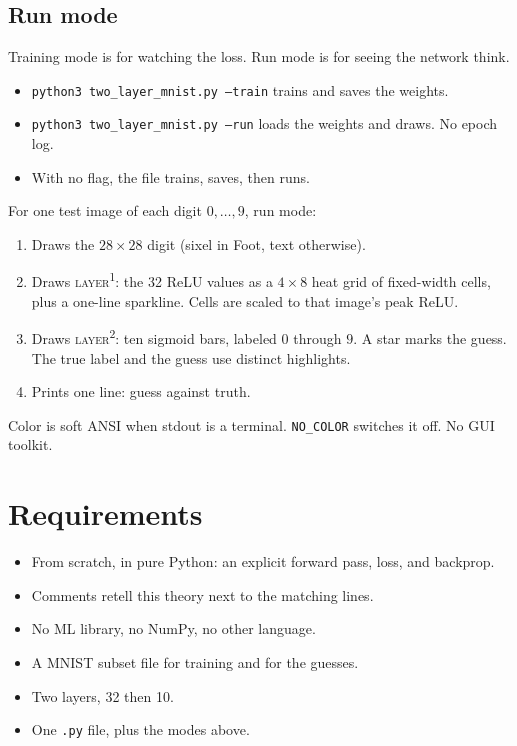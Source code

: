 \documentclass[11pt]{article}
\begin{document}
\subsection*{Run mode}

Training mode is for watching the loss. Run mode is for seeing the network think.

\begin{itemize}
  \item \texttt{python3 two\_layer\_mnist.py --train} trains and saves the weights.
  \item \texttt{python3 two\_layer\_mnist.py --run} loads the weights and draws. No epoch log.
  \item With no flag, the file trains, saves, then runs.
\end{itemize}

For one test image of each digit $0,\ldots,9$, run mode:

\begin{enumerate}
  \item Draws the $28\times 28$ digit (sixel in Foot, text otherwise).
  \item Draws \textsc{layer}\textsuperscript{1}: the 32 ReLU values as a $4\times 8$ heat grid of fixed-width cells, plus a one-line sparkline. Cells are scaled to that image's peak ReLU.
  \item Draws \textsc{layer}\textsuperscript{2}: ten sigmoid bars, labeled $0$ through $9$. A star marks the guess. The true label and the guess use distinct highlights.
  \item Prints one line: guess against truth.
\end{enumerate}

Color is soft ANSI when stdout is a terminal. \texttt{NO\_COLOR} switches it off. No GUI toolkit.

\section*{Requirements}

\begin{itemize}
  \item From scratch, in pure Python: an explicit forward pass, loss, and backprop.
  \item Comments retell this theory next to the matching lines.
  \item No ML library, no NumPy, no other language.
  \item A MNIST subset file for training and for the guesses.
  \item Two layers, 32 then 10.
  \item One \texttt{.py} file, plus the modes above.
\end{itemize}
\end{document}
